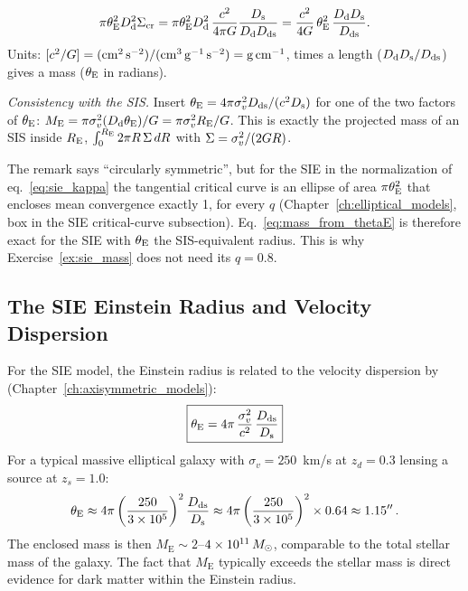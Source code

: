 \begin{derivation}
\[
  \pi\theta_{\mathrm{E}}^2D_{\mathrm{d}}^2\Sigma_{\mathrm{cr}}
  = \pi\theta_{\mathrm{E}}^2D_{\mathrm{d}}^2\,\frac{c^2}{4\pi G}\frac{D_{\mathrm{s}}}{D_{\mathrm{d}}D_{\mathrm{ds}}}
  = \frac{c^2}{4G}\,\theta_{\mathrm{E}}^2\,\frac{D_{\mathrm{d}}D_{\mathrm{s}}}{D_{\mathrm{ds}}}.
\]
Units: $[c^2/G] = (\mathrm{cm^2\,s^{-2}})/(\mathrm{cm^3\,g^{-1}\,s^{-2}}) = \mathrm{g\,cm^{-1}}$,
times a length ($D_{\mathrm{d}}D_{\mathrm{s}}/D_{\mathrm{ds}}$) gives a mass ($\theta_{\mathrm{E}}$ in radians).

\textit{Consistency with the SIS.}  Insert
$\theta_{\mathrm{E}} = 4\pi\sigma_v^2D_{\mathrm{ds}}/(c^2D_{\mathrm{s}})$ for one of the two factors
of $\theta_{\mathrm{E}}$:
$M_{\mathrm{E}} = \pi\sigma_v^2(D_{\mathrm{d}}\theta_{\mathrm{E}})/G = \pi\sigma_v^2R_{\mathrm{E}}/G$.
This is exactly the projected mass of an SIS inside $R_{\mathrm{E}}$,
$\int_0^{R_{\mathrm{E}}}2\pi R\,\Sigma\,dR$ with $\Sigma = \sigma_v^2/(2G R)$.
\end{derivation}

\begin{annotation}
The remark says ``circularly symmetric'', but for the SIE in the normalization
of eq.~\eqref{eq:sie_kappa} the tangential critical curve is an ellipse of
area $\pi\theta_{\mathrm{E}}^2$ that encloses mean convergence exactly 1, for every $q$
(Chapter~\ref{ch:elliptical_models}, box in the SIE critical-curve subsection).
Eq.~\eqref{eq:mass_from_thetaE} is therefore exact for the SIE with $\theta_{\mathrm{E}}$
the SIS-equivalent radius.  This is why Exercise~\ref{ex:sie_mass} does not
need its $q = 0.8$.
\end{annotation}


\subsection{The SIE Einstein Radius and Velocity Dispersion}

For the SIE model, the Einstein radius is related to the velocity
dispersion by (Chapter~\ref{ch:axisymmetric_models}):
\begin{equation}
    \boxed{
    \theta_{\mathrm{E}} = 4\pi\,\frac{\sigma_v^2}{c^2}
    \,\frac{D_{\mathrm{ds}}}{D_{\mathrm{s}}}
    }
    \label{eq:thetaE_sie}
\end{equation}
For a typical massive elliptical galaxy with $\sigma_v = 250$~km/s
at $z_d = 0.3$ lensing a source at $z_s = 1.0$:
\begin{equation}
    \theta_{\mathrm{E}} \approx 4\pi \left(\frac{250}{3 \times 10^5}\right)^2
    \frac{D_{\mathrm{ds}}}{D_{\mathrm{s}}}
    \approx 4\pi \left(\frac{250}{3 \times 10^5}\right)^2 \times 0.64
    \approx 1.15'' \,.
    \label{eq:thetaE_numerical}
\end{equation}
The enclosed mass is then $M_{\mathrm{E}} \sim 2$--$4 \times
10^{11}\,M_{\odot}$, comparable to the total stellar mass of the
galaxy.  The fact that $M_{\mathrm{E}}$ typically exceeds the
stellar mass is direct evidence for dark matter within the Einstein
radius.

